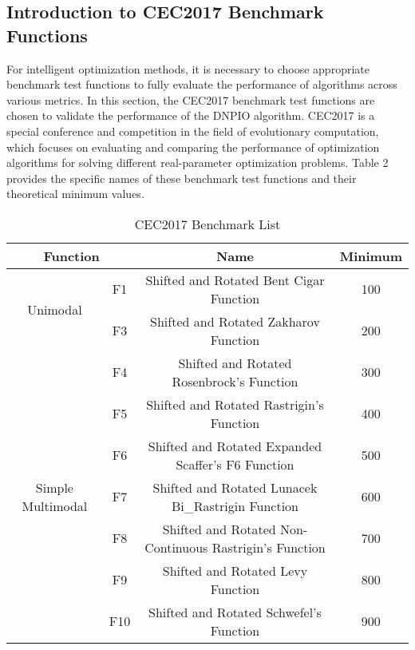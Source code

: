 \documentclass[preprint,review,compress,12pt]{elsarticle}
\begin{document}
\subsection{Introduction to CEC2017 Benchmark Functions}
For intelligent optimization methods, it is necessary to choose appropriate benchmark test functions to fully evaluate the performance of algorithms across various metrics. In this section, the CEC2017 benchmark test functions are chosen to validate the performance of the DNPIO algorithm. CEC2017 is a special conference and competition in the field of evolutionary computation, which focuses on evaluating and comparing the performance of optimization algorithms for solving different real-parameter optimization problems. Table 2 provides the specific names of these benchmark test functions and their theoretical minimum values.
\begin{table}[H]
\centering
\caption{CEC2017 Benchmark List}
\begin{tabular}{cccc}
\toprule
\multicolumn{2}{c}{Function}        & Name                                                       & Minimum  \\
\midrule
\multirow{2}{*}{Unimodal}     & F1  & Shifted and Rotated Bent Cigar   Function                 & 100  \\
                        & F3  & Shifted and Rotated   Zakharov Function                   & 200  \\
\midrule
\multirow{7}{*}{Simple Multimodal} & F4  & Shifted and Rotated   Rosenbrock’s Function               & 300  \\
                        & F5  & Shifted and Rotated   Rastrigin’s Function                & 400  \\
                        & F6  & Shifted and Rotated   Expanded Scaffer’s F6 Function      & 500  \\
                        & F7  & Shifted and Rotated   Lunacek Bi\_Rastrigin Function      & 600  \\
                        & F8  & Shifted and Rotated   Non-Continuous Rastrigin’s Function & 700  \\
                        & F9  & Shifted and Rotated   Levy Function                       & 800  \\
                        & F10 & Shifted and Rotated Schwefel’s Function                   & 900  \\
                   \bottomrule     
\end{tabular}
\end{table}
\end{document}
